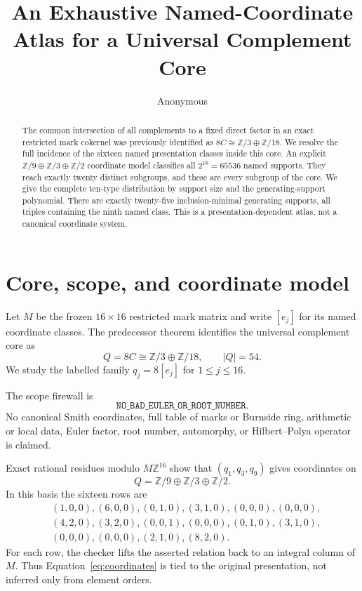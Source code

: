 \documentclass[10pt]{article}
\title{An Exhaustive Named-Coordinate Atlas for a Universal Complement Core}
\author{Anonymous}
\date{}
\newcommand{\Z}{\mathbb Z}
\begin{document}
\maketitle

\begin{abstract}
The common intersection of all complements to a fixed direct factor in an
exact restricted mark cokernel was previously identified as
$8C\cong\mathbb Z/3\oplus\mathbb Z/18$.  We resolve the full incidence of
the sixteen named presentation classes inside this core.  An explicit
$\mathbb Z/9\oplus\mathbb Z/3\oplus\mathbb Z/2$ coordinate model classifies
all $2^{16}=65536$ named supports.  They reach exactly twenty distinct
subgroups, and these are every subgroup of the core.  We give the complete
ten-type distribution by support size and the generating-support polynomial.
There are exactly twenty-five inclusion-minimal generating supports, all
triples containing the ninth named class.  This is a presentation-dependent
atlas, not a canonical coordinate system.
\end{abstract}

\section{Core, scope, and coordinate model}
Let $M$ be the frozen $16\times16$ restricted mark matrix and write
$[e_j]$ for its named coordinate classes.  The predecessor theorem identifies
the universal complement core as
\[
 Q=8C\cong\Z/3\oplus\Z/18,
 \qquad |Q|=54.
\]
We study the labelled family $q_j=8[e_j]$ for $1\leq j\leq16$.

The scope firewall is
\[
 \texttt{NO\_BAD\_EULER\_OR\_ROOT\_NUMBER}.
\]
No canonical Smith coordinates, full table of marks or Burnside ring,
arithmetic or local data, Euler factor, root number, automorphy, or
Hilbert--Polya operator is claimed.

Exact rational residues modulo $M\Z^{16}$ show that
$(q_1,q_3,q_9)$ gives coordinates on
\[
 Q=\Z/9\oplus\Z/3\oplus\Z/2.
\]
In this basis the sixteen rows are
\begin{equation}\label{eq:coordinates}
\begin{split}
&(1,0,0),(6,0,0),(0,1,0),(3,1,0),(0,0,0),(0,0,0),\\
&(4,2,0),(3,2,0),(0,0,1),(0,0,0),(0,1,0),(3,1,0),\\
&(0,0,0),(0,0,0),(2,1,0),(8,2,0).
\end{split}
\end{equation}
For each row, the checker lifts the asserted relation back to an integral
column of $M$.  Thus Equation~\eqref{eq:coordinates} is tied to the original
presentation, not inferred only from element orders.
\end{document}
